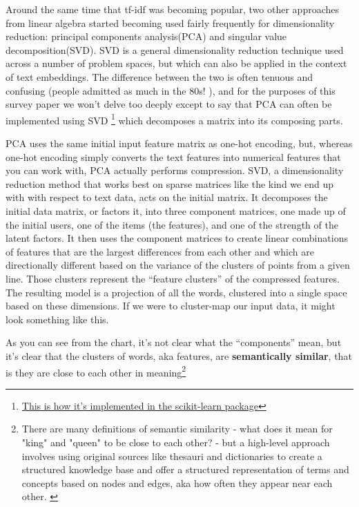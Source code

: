 \documentclass[11pt]{diazessay} %
\begin{document}
Around the same time that tf-idf was becoming popular, two other approaches from linear algebra started becoming used fairly frequently for dimensionality reduction: principal components analysis(PCA) and singular value decomposition(SVD).  SVD is a general dimensionality reduction technique used across a number of problem spaces, but which can also be applied in the context of text embeddings. The difference between the two is often tenuous and confusing (people admitted as much in the 80s! \cite{gerbrands1981relationships}), and for the purposes of this survey paper we won't delve too deeply except to say that PCA can often be implemented using SVD \footnote{\href{https://scikit-learn.org/stable/modules/generated/sklearn.decomposition.PCA.html}{This is how it's implemented in the scikit-learn package}} which decomposes a matrix into its composing parts. 

PCA uses the same initial input feature matrix as one-hot encoding, but, whereas one-hot encoding simply converts the text features into numerical features that you can work with, PCA actually performs compression.  SVD, a dimensionality reduction method that works best on sparse matrices like the kind we end up with with respect to text data,  acts on the initial matrix. It decomposes the initial data matrix, or factors it, into three component matrices, one made up of the initial users, one of the items (the features), and one of the strength of the latent factors. It then uses the component matrices to create linear combinations of features that are the largest differences from each other and which are directionally different based on the variance of the clusters of points from a given line.   Those clusters represent the “feature clusters” of the compressed features.  
The resulting model is a projection of all the words, clustered into a single space based on these dimensions. If we were to cluster-map our input data, it might look something like this. 


As you can see from the chart, it’s not clear what the “components” mean, but it’s clear that the clusters of words, aka features, are \textbf{semantically similar}, that is they are close to each other in meaning\footnote{There are many definitions of semantic similarity - what does it mean for "king" and "queen" to be close to each other? - but a high-level approach involves using original sources like thesauri and dictionaries to create a structured knowledge base and offer a structured representation of terms and concepts based on nodes and edges, aka how often they appear near each other. \cite{chandrasekaran2021evolution}}
\end{document}

